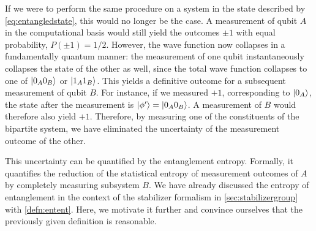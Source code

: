 If we were to perform the same procedure on a system in the state described by
\cref{eq:entangledstate}, this would no longer be the case. A measurement of
qubit $A$ in the computational basis would still yield the outcomes $\pm 1$
with equal probability, $P(\pm 1)= 1/2$. However, the wave function now
collapses in a fundamentally quantum manner: the measurement of one qubit
instantaneously collapses the state of the other as well, since the total wave
function collapses to one of $\ket{0_A 0_B}$ or $\ket{1_A 1_B}$. This yields a
definitive outcome for a subsequent measurement of qubit $B$. For instance, if
we measured $+1$, corresponding to $\ket{0_A}$, the state after the measurement
is $\ket{\phi'} = \ket{0_A 0_B}$. A measurement of $B$ would therefore also
yield $+1$.  Therefore, by measuring one of the constituents of the bipartite
system, we have eliminated the uncertainty of the measurement outcome of the
other. 

This uncertainty can be quantified by the entanglement entropy. Formally, it
quantifies the reduction of the statistical entropy of measurement outcomes of
$A$ by completely measuring subsystem $B$. We have already discussed the
entropy of entanglement in the context of the stabilizer formalism in
\cref{sec:stabilizergroup} with \cref{defn:entent}. Here, we motivate it
further and convince ourselves that the previously given definition is
reasonable.

